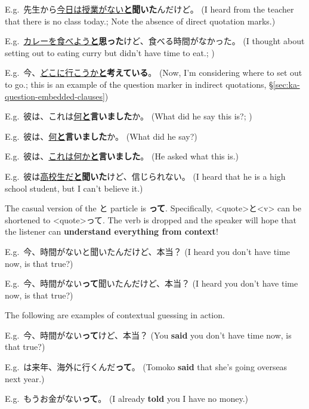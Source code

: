 \documentclass[../nihongo-gakushuu-kyouzai-grammar.tex]{subfiles}
\begin{document}
E.g.\ 先生から\ul{今日は授業がない\textbf{と}}\textbf{聞いた}んだけど。 (I heard from the teacher that there is no class today.; Note the absence of direct quotation marks.)

E.g.\ \ul{カレーを食べよう\textbf{と}}\textbf{思った}けど、食べる時間がなかった。 (I thought about setting out to eating curry but didn't have time to eat.; )

E.g.\ 今、\ul{どこに行こうか\textbf{と}}\textbf{考えている}。 (Now, I'm considering where to set out to go.; this is an example of the question marker in indirect quotations, \S\ref{sec:ka-question-embedded-clauses})

E.g.\ 彼は、これは\ul{何\textbf{と}}\textbf{言いました}か。 (What did he say this is?; )

E.g.\ 彼は、\ul{何\textbf{と}}\textbf{言いました}か。 (What did he say?)

E.g.\ 彼は、\ul{これは何か\textbf{と}}\textbf{言いました}。 (He asked what this is.)

E.g.\ 彼は\ul{高校生だ\textbf{と}}\textbf{聞いた}けど、信じられない。 (I heard that he is a high school student, but I can't believe it.)

The casual version of the と particle is \textbf{って}. Specifically, <quote>と<v> can be shortened to <quote>って. The verb is dropped and the speaker will hope that the listener can \textbf{understand everything from context}! 

E.g.\ 今、時間がないと聞いたんだけど、本当？ (I heard you don't have time now, is that true?)

E.g.\ 今、時間がない\textbf{って}聞いたんだけど、本当？ (I heard you don't have time now, is that true?)

The following are examples of contextual guessing in action. 

E.g.\ 今、時間がない\textbf{って}けど、本当？ (You \textbf{said} you don't have time now, is that true?)

E.g.\ は来年、海外に行くんだ\textbf{って}。 (Tomoko \textbf{said} that she's going overseas next year.)

E.g.\ もうお金がない\textbf{って}。 (I already \textbf{told} you I have no money.)
\end{document}
